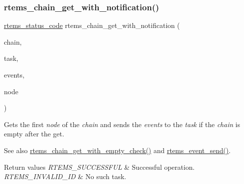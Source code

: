 \subsubsection{\texorpdfstring{rtems\_chain\_get\_with\_notification()}{rtems\_chain\_get\_with\_notification()}}
{\footnotesize\ttfamily \mbox{\hyperlink{group__ClassicStatus_ga545d41846817eaba6143d52ee4d9e9fe}{rtems\+\_\+status\+\_\+code}} rtems\+\_\+chain\+\_\+get\+\_\+with\+\_\+notification (\begin{DoxyParamCaption}\item[{\mbox{\hyperlink{unionChain__Control}{rtems\+\_\+chain\+\_\+control}} $\ast$}]{chain,  }\item[{\mbox{\hyperlink{group__ClassicTasks_gab20892b814dced7dd4e5b9bf42becd57}{rtems\+\_\+id}}}]{task,  }\item[{\mbox{\hyperlink{group__ClassicEventSet_gab7b8f373bea85fd4e3b7ae23905faa07}{rtems\+\_\+event\+\_\+set}}}]{events,  }\item[{\mbox{\hyperlink{structChain__Node__struct}{rtems\+\_\+chain\+\_\+node}} $\ast$$\ast$}]{node }\end{DoxyParamCaption})}



Gets the first {\itshape node} of the {\itshape chain} and sends the {\itshape events} to the {\itshape task} if the {\itshape chain} is empty after the get. 

\begin{DoxySeeAlso}{See also}
\mbox{\hyperlink{group__ClassicChains_gad87341d58edec44ef841a5103a922e5c}{rtems\+\_\+chain\+\_\+get\+\_\+with\+\_\+empty\+\_\+check()}} and \mbox{\hyperlink{group__ClassicEvent_ga2d31674c165127bc530178d06d557b94}{rtems\+\_\+event\+\_\+send()}}.
\end{DoxySeeAlso}

\begin{DoxyRetVals}{Return values}
{\em R\+T\+E\+M\+S\+\_\+\+S\+U\+C\+C\+E\+S\+S\+F\+UL} & Successful operation. \\
\hline
{\em R\+T\+E\+M\+S\+\_\+\+I\+N\+V\+A\+L\+I\+D\+\_\+\+ID} & No such task. \\
\hline
\end{DoxyRetVals}
\mbox{\label{group__ClassicChains_ga034868a839c5ad15e0437731730d3abb}} 
